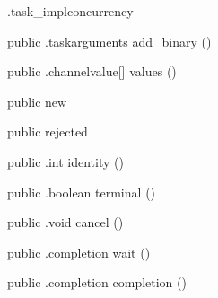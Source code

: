 \begin{CrexxClass}{.task\_impl}{concurrency}
\begin{Members}
    \Method
      {public}
      {.taskarguments}
      {add\_binary}
      {()}

    \Method
      {public}
      {.channelvalue[]}
      {values}
      {()}

    \Factory
      {public}
      {new}
      {}

    \Factory
      {public}
      {rejected}
      {}

    \Method
      {public}
      {.int}
      {identity}
      {()}

    \Method
      {public}
      {.boolean}
      {terminal}
      {()}

    \Method
      {public}
      {.void}
      {cancel}
      {()}

    \Method
      {public}
      {.completion}
      {wait}
      {()}

    \Method
      {public}
      {.completion}
      {completion}
      {()}

  \end{Members}
\end{CrexxClass}

